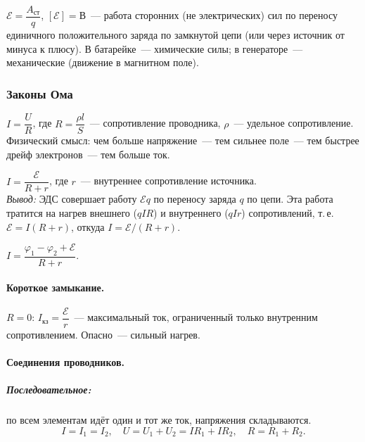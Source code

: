\documentclass[12pt]{article}
\begin{document}
\begin{definition}
	$\mathcal{E} = \dfrac{A_{\text{ст}}}{q}$, $[\mathcal{E}] = \text{В}$~--- работа сторонних (не электрических) сил по переносу единичного положительного заряда по замкнутой цепи (или через источник от минуса к плюсу). В батарейке~--- химические силы; в генераторе~--- механические (движение в магнитном поле).
\end{definition}

\subsubsection{Законы Ома}

\begin{law}
	$I = \dfrac{U}{R}$, где $R = \dfrac{\rho l}{S}$~--- сопротивление проводника, $\rho$~--- удельное сопротивление.\\
	Физический смысл: чем больше напряжение~--- тем сильнее поле~--- тем быстрее дрейф электронов~--- тем больше ток.
\end{law}

\begin{law}
	$I = \dfrac{\mathcal{E}}{R + r}$, где $r$~--- внутреннее сопротивление источника.\\
	\textit{Вывод:} ЭДС совершает работу $\mathcal{E}q$ по переносу заряда $q$ по цепи. Эта работа тратится на нагрев внешнего ($qIR$) и внутреннего ($qIr$) сопротивлений, т.\,е. $\mathcal{E} = I(R+r)$, откуда $I = \mathcal{E}/(R+r)$.
\end{law}

\begin{law}
	$I = \dfrac{\varphi_1 - \varphi_2 + \mathcal{E}}{R + r}$.
\end{law}

\paragraph{Короткое замыкание.} $R = 0$: $I_{\text{кз}} = \dfrac{\mathcal{E}}{r}$~--- максимальный ток, ограниченный только внутренним сопротивлением. Опасно~--- сильный нагрев.

\paragraph{Соединения проводников.}

\subparagraph{Последовательное:} по всем элементам идёт один и тот же ток, напряжения складываются.
\[
	I = I_1 = I_2, \quad U = U_1 + U_2 = IR_1 + IR_2, \quad R = R_1 + R_2.
\]
\end{document}
